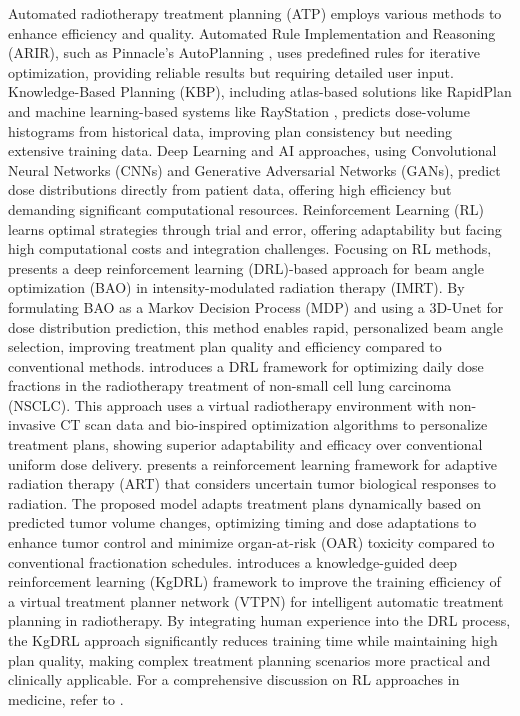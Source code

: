 \documentclass[runningheads]{llncs}
\begin{document}
Automated radiotherapy treatment planning (ATP) employs various methods to enhance efficiency and quality. Automated Rule Implementation and Reasoning (ARIR), such as Pinnacle's AutoPlanning \cite{pinnacle}, uses predefined rules for iterative optimization, providing reliable results but requiring detailed user input. Knowledge-Based Planning (KBP), including atlas-based solutions like RapidPlan \cite{kb} and machine learning-based systems like RayStation \cite{raystation}, predicts dose-volume histograms from historical data, improving plan consistency but needing extensive training data. 
Deep Learning and AI approaches, using Convolutional Neural Networks (CNNs) and Generative Adversarial Networks (GANs), predict dose distributions directly from patient data, offering high efficiency but demanding significant computational resources. Reinforcement Learning (RL) learns optimal strategies through trial and error, offering adaptability but facing high computational costs and integration challenges. Focusing on RL methods, \cite{rl_beam_radiotherapy} presents a deep reinforcement learning (DRL)-based approach for beam angle optimization (BAO) in intensity-modulated radiation therapy (IMRT). By formulating BAO as a Markov Decision Process (MDP) and using a 3D-Unet for dose distribution prediction, this method enables rapid, personalized beam angle selection, improving treatment plan quality and efficiency compared to conventional methods. \cite{rl_radiotherapy_2} introduces a DRL framework for optimizing daily dose fractions in the radiotherapy treatment of non-small cell lung carcinoma (NSCLC). This approach uses a virtual radiotherapy environment with non-invasive CT scan data and bio-inspired optimization algorithms to personalize treatment plans, showing superior adaptability and efficacy over conventional uniform dose delivery. \cite{rl_radiotherapy_3} presents a reinforcement learning framework for adaptive radiation therapy (ART) that considers uncertain tumor biological responses to radiation. The proposed model adapts treatment plans dynamically based on predicted tumor volume changes, optimizing timing and dose adaptations to enhance tumor control and minimize organ-at-risk (OAR) toxicity compared to conventional fractionation schedules. \cite{rl_radiotherapy_4} introduces a knowledge-guided deep reinforcement learning (KgDRL) framework to improve the training efficiency of a virtual treatment planner network (VTPN) for intelligent automatic treatment planning in radiotherapy. By integrating human experience into the DRL process, the KgDRL approach significantly reduces training time while maintaining high plan quality, making complex treatment planning scenarios more practical and clinically applicable. For a comprehensive discussion on RL approaches in medicine, refer to \cite{rl_medicine_survey, rl_medicine_literature_review}. 
\end{document}
